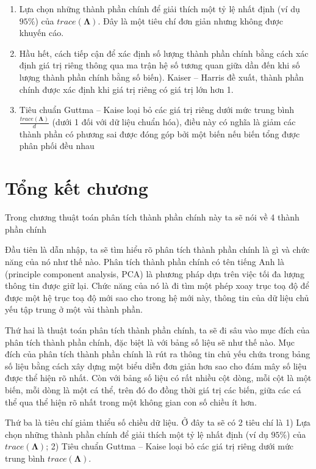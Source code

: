\documentclass[../thesis.tex]{subfiles}
\begin{document}
\begin{enumerate}
	\item Lựa chọn những thành phần chính để giải thích một tỷ lệ nhất định (ví dụ $ 95\% $) của $ trace(\bm{\Lambda}) $. Đây là một tiêu chí đơn giản nhưng không được khuyến cáo.
	\item Hầu hết, cách tiếp cận để xác định số lượng thành phần chính bằng cách xác định giá trị riêng thông qua ma trận hệ số tương quan giữa dần đến khi số lượng thành phần chính bằng số biến). Kaiser -- Harris đề xuất, thành phần chính được xác định khi giá trị riêng có giá trị lớn hơn 1.
	\item Tiêu chuẩn Guttma -- Kaise loại bỏ các giá trị riêng dưới mức trung bình $ \tfrac{trace(\bm{\Lambda})}{d} $ (dưới 1 đối với dữ liệu chuẩn hóa), điều này có nghĩa là giảm các thành phần có phương sai được đóng góp bởi một biến nếu biến tổng được phân phối đều nhau
\end{enumerate}

\newpage
\section*{Tổng kết chương}

Trong chương thuật toán phân tích thành phần chính này ta sẽ nói về 4 thành phần chính

Đầu tiên là dẫn nhập, ta sẽ tìm hiểu rõ phân tích thành phần chính là gì và chức năng của nó như thế nào. Phân tích thành phần chính có tên tiếng Anh là (principle component analysis, PCA) là phương pháp dựa trên việc tối đa
lượng thông tin được giữ lại. Chức năng của nó là đi tìm một phép xoay trục toạ độ để được một hệ trục toạ độ mới sao cho trong hệ mới này, thông tin của dữ liệu chủ yếu tập trung ở một vài thành phần. 

Thứ hai là thuật toán phân tích thành phần chính, ta sẽ đi sâu vào mục đích của phân tích thành phần chính, đặc biệt là với bảng số liệu sẽ như thế nào. Mục đích của phân tích thành phần chính là rút ra thông tin chủ yếu chứa trong bảng số liệu bằng cách xây dựng một biểu diễn đơn giản hơn sao cho đám mây số liệu được thể hiện rõ nhất. Còn với bảng số liệu có rất nhiều cột dòng, mỗi cột là một biến, mỗi dòng là một cá thể, trên đó đo đồng thời giá trị các biến, giữa các cá thể qua thể hiện rõ nhất trong một không gian con số chiều ít hơn.

Thứ ba là tiêu chí giảm thiểu số chiều dữ liệu. Ở đây ta sẽ có 2 tiêu chí là 1) Lựa chọn những thành phần chính để giải thích một tỷ lệ nhất định (ví dụ $ 95\% $) của $ trace(\bm{\Lambda}) $; 2)  Tiêu chuẩn Guttma – Kaise loại bỏ các giá trị riêng dưới mức trung bình $ trace(\bm{\Lambda}) $.
\end{document}
